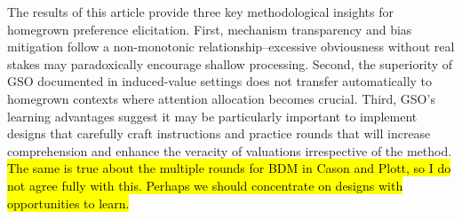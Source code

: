 \documentclass[12pt]{article}
\begin{document}
The results of this article provide three key methodological insights for homegrown preference elicitation. First, mechanism transparency and bias mitigation follow a non-monotonic relationship--excessive obviousness without real stakes may paradoxically encourage shallow processing. Second, the superiority of GSO documented in induced-value settings does not transfer automatically to homegrown contexts where attention allocation becomes crucial. Third, GSO's learning advantages suggest it may be particularly important to implement designs that carefully craft instructions and practice rounds that will increase comprehension and enhance the veracity of valuations irrespective of the method. %
\hl{The same is true about the multiple rounds for BDM in Cason and Plott, so I do not agree fully with this. Perhaps we should concentrate on designs with opportunities to learn.}
\end{document}
